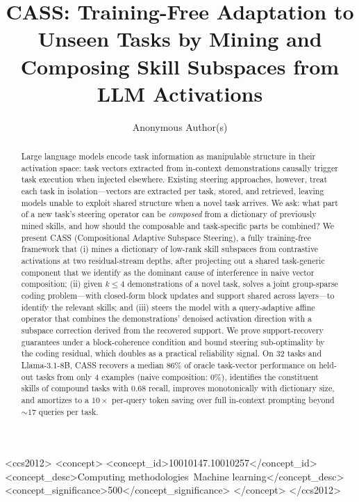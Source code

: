 \documentclass[sigconf,review,anonymous]{acmart}
\newcommand{\method}{\textsc{CASS}}
\begin{document}
\title{\method: Training-Free Adaptation to Unseen Tasks by Mining and
Composing Skill Subspaces from LLM Activations}

\author{Anonymous Author(s)}

\begin{abstract}
Large language models encode task information as manipulable structure in
their activation space: task vectors extracted from in-context demonstrations
causally trigger task execution when injected elsewhere. Existing steering
approaches, however, treat each task in isolation---vectors are extracted per
task, stored, and retrieved, leaving models unable to exploit shared structure
when a novel task arrives. We ask: what part of a new task's steering operator
can be \emph{composed} from a dictionary of previously mined skills, and how
should the composable and task-specific parts be combined? We present \method{}
(Compositional Adaptive Subspace Steering), a fully training-free framework
that (i) mines a dictionary of low-rank skill subspaces from contrastive
activations at two residual-stream depths, after projecting out a shared
task-generic component that we identify as the dominant cause of interference
in naive vector composition; (ii) given $k\le 4$ demonstrations of a novel
task, solves a joint group-sparse coding problem---with closed-form block
updates and support shared across layers---to identify the relevant skills;
and (iii) steers the model with a query-adaptive affine operator that combines
the demonstrations' denoised activation direction with a subspace correction
derived from the recovered support. We prove support-recovery guarantees under
a block-coherence condition and bound steering sub-optimality by the coding
residual, which doubles as a practical reliability signal. On 32 tasks and
Llama-3.1-8B, \method{} recovers a median 86\% of oracle task-vector
performance on held-out tasks from only 4 examples (naive composition: 0\%),
identifies the constituent skills of compound tasks with 0.68 recall,
improves monotonically with dictionary size, and amortizes to a $10\times$
per-query token saving over full in-context prompting beyond ${\sim}17$
queries per task.
\end{abstract}

\begin{CCSXML}
<ccs2012>
 <concept>
  <concept_id>10010147.10010257</concept_id>
  <concept_desc>Computing methodologies~Machine learning</concept_desc>
  <concept_significance>500</concept_significance>
 </concept>
</ccs2012>
\end{CCSXML}
\end{document}
